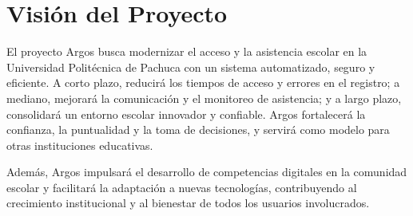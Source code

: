 \section{Visión del Proyecto}

El proyecto Argos busca modernizar el acceso y la asistencia escolar en la Universidad Politécnica de Pachuca con un sistema automatizado, seguro y eficiente. A corto plazo, reducirá los tiempos de acceso y errores en el registro; a mediano, mejorará la comunicación y el monitoreo de asistencia; y a largo plazo, consolidará un entorno escolar innovador y confiable. Argos fortalecerá la confianza, la puntualidad y la toma de decisiones, y servirá como modelo para otras instituciones educativas.

Además, Argos impulsará el desarrollo de competencias digitales en la comunidad escolar y facilitará la adaptación a nuevas tecnologías, contribuyendo al crecimiento institucional y al bienestar de todos los usuarios involucrados.
